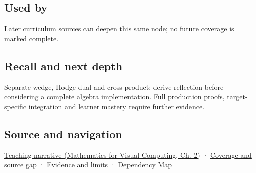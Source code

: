 \subsection{Used by}\label{appendix-e1960925d1b8-used-by}

\hypertarget{appendix-e1960925d1b8-used-by}{}

Later curriculum sources can deepen this same node; no future coverage is marked complete.

\subsection{Recall and next depth}\label{appendix-e1960925d1b8-recall-and-next-depth}

\hypertarget{appendix-e1960925d1b8-recall-and-next-depth}{}

Separate wedge, Hodge dual and cross product; derive reflection before considering a complete algebra implementation. Full production proofs, target-specific integration and learner mastery require further evidence.

\subsection{Source and navigation}\label{appendix-e1960925d1b8-source-and-navigation}

\hypertarget{appendix-e1960925d1b8-source-and-navigation}{}

\href{../02-Mathematics-for-Visual-Computing/main.pdf\#nameddest=01-foundations-i-ch018-oriented-areas-deserve-their-own-representation}{Teaching narrative (Mathematics for Visual Computing, Ch. 2)} · \hyperref[appendix-fd090d982a15-phase-6---parts-501-600]{Coverage and source gap} · \hyperref[appendix-a103e7846d21-phase-6---source-analysis-and-verification]{Evidence and limits} · \hyperref[appendix-4ad47bdd269a]{Dependency Map}
